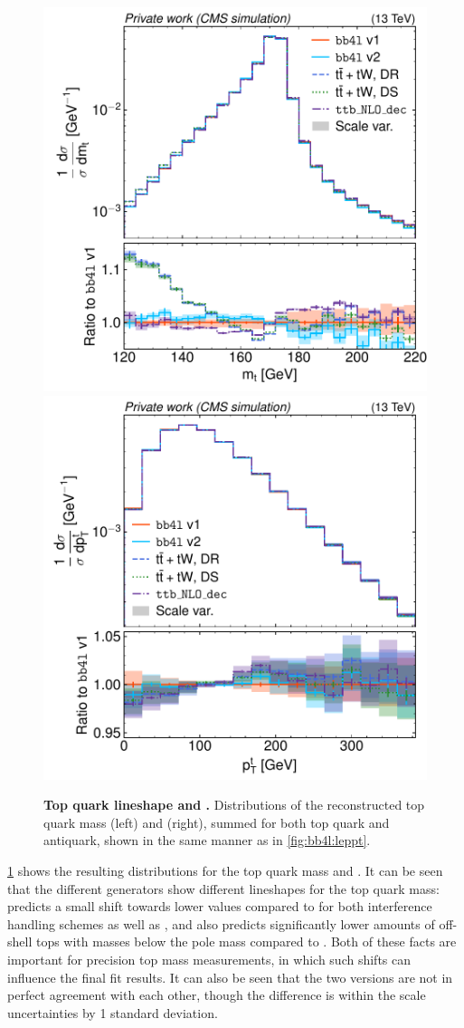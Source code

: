 \begin{figure}[tp]
    \centering
    \includegraphics[width=0.49 \textwidth]{figures/bb4l/generators/MC_TTBAR_DILEP_SPINDENSITY_anytop_mass.pdf}
    \hfill
    \includegraphics[width=0.49 \textwidth]{figures/bb4l/generators/MC_TTBAR_DILEP_SPINDENSITY_anytop_pt.pdf}
    \caption{\textbf{Top quark lineshape and \pt.} Distributions of the reconstructed top quark mass (left) and \pt (right), summed for both top quark and antiquark, shown in the same manner as in \cref{fig:bb4l:leppt}.}
    \label{fig:bb4l:top}
\end{figure}

\cref{fig:bb4l:top} shows the resulting distributions for the top quark mass and \pt. It can be seen that the different generators show different lineshapes for the top quark mass: \bbfourl predicts a small shift towards lower values compared to \tttWsum for both interference handling schemes as well as \ttb, and also predicts significantly lower amounts of off-shell tops with masses below the pole mass compared to \tttWsum. Both of these facts are important for precision top mass measurements, in which such shifts can influence the final fit results. It can also be seen that the two \bbfourl versions are not in perfect agreement with each other, though the difference is within the scale uncertainties by 1 standard deviation.

